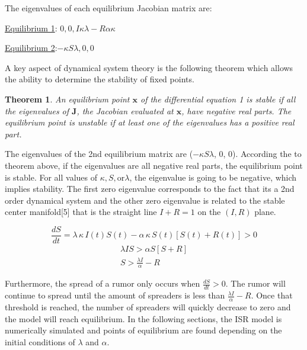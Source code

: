 \documentclass[11pt]{article}
\begin{document}
The eigenvalues of each equilibrium Jacobian matrix are:

\underline{Equilibrium 1}: {$0, 0, I\kappa\lambda - R\alpha\kappa$}

\underline{Equilibrium 2}:{$-\kappa S\lambda, 0, 0$}


A key aspect of dynamical system theory is the following theorem which allows the ability to determine the stability of fixed points.

\newtheorem{theorem}{Theorem}
\begin{theorem}
An equilibrium point $\mathbf{x}$ of the differential equation 1 is stable if all the eigenvalues of $\mathbf{J}$, the Jacobian evaluated at $\mathbf{x}$, have negative real parts. The equilibrium point is unstable if at least one of the eigenvalues has a positive real part.
\end{theorem}



The eigenvalues of the 2nd equilibrium matrix are ($-\kappa S \lambda$, 0, 0). According the to theorem above, if the eigenvalues are all negative real parts, the equilibrium point is stable. For all values of $\kappa, S, \textrm{or} \lambda$, the eigenvalue is going to be negative, which implies stability. The first zero eigenvalue corresponds to the fact that its a 2nd order dynamical system and the other zero eigenvalue is related to the stable center manifold[5] that is the straight line $I + R = 1$ on the $(I, R)$ plane.

\begin{equation*}
\frac{dS}{dt} =  \lambda\,\kappa\,I(t)S(t)-\alpha\,\kappa\,S(t) \left[ S(t)+R(t) \right] > 0
\end{equation*}
\begin{align*}
\lambda I S > \alpha S[S+R] \\
S > \frac{\lambda I}{\alpha} - R
\end{align*}

Furthermore, the spread of a rumor only occurs when $\frac{dS}{dt} > 0$. The rumor will continue to spread until the amount of spreaders is less than $\frac{\lambda I}{\alpha} - R$. Once that threshold is reached, the number of spreaders will quickly decrease to zero and the model will reach equilibrium. In the following sections, the ISR model is numerically simulated and points of equilibrium are found depending on the initial conditions of $\lambda$ and $\alpha$.


\end{document}
